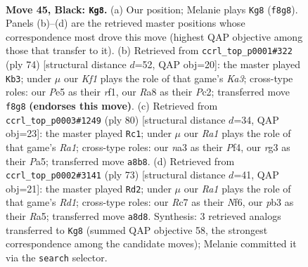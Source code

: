 \documentclass[11pt]{article}
\begin{document}
\clearpage

\begin{figure}[p]\centering
\begin{subfigure}{0.46\textwidth}\centering
\resizebox{\linewidth}{!}{%
\newchessgame
\chessboard[
  setfen={r4k2/2r2p1p/1n4p1/p3p1P1/P3P3/NP4RP/4K1P1/R7 b - - 5 45},
  showmover=false,
  pgfstyle=straightmove, color=movearrow, markmove={f8-g8}
]}
\caption{}
\end{subfigure}\hfill
\begin{subfigure}{0.46\textwidth}\centering
\resizebox{\linewidth}{!}{%
\newchessgame
\chessboard[
  setfen={3k4/p2r1p2/1pR1p1p1/1P2P3/P3R2P/K7/2P4P/5r2 w - - 7 38},
  showmover=false,
  pgfstyle=straightmove, color=movearrow, markmove={a3-b3}
]}
\caption{}
\end{subfigure}
\\[4pt]
\begin{subfigure}{0.46\textwidth}\centering
\resizebox{\linewidth}{!}{%
\newchessgame
\chessboard[
  setfen={r4r2/1R3ppk/p1N1p3/P2p3p/3P1P2/1P2n2P/6P1/R5K1 w - - 0 41},
  showmover=false,
  pgfstyle=straightmove, color=movearrow, markmove={a1-c1}
]}
\caption{}
\end{subfigure}\hfill
\begin{subfigure}{0.46\textwidth}\centering
\resizebox{\linewidth}{!}{%
\newchessgame
\chessboard[
  setfen={3r2k1/1p6/2p2n1p/r4Pp1/2P5/p1R2PP1/P4N1P/R5K1 b - - 0 37},
  showmover=false,
  pgfstyle=straightmove, color=movearrow, markmove={d8-d2}
]}
\caption{}
\end{subfigure}
\caption{\textbf{Move 45, Black: \texttt{Kg8}.} (a) Our position; Melanie plays \texttt{Kg8} (\texttt{f8g8}). Panels (b)--(d) are the retrieved master positions whose correspondence most drove this move (highest QAP objective among those that transfer to it). (b) Retrieved from \texttt{ccrl\_top\_p0001\#322} (ply 74) [structural distance $d$=52, QAP obj=20]: the master played \texttt{Kb3}; under $\mu$ our \emph{Kf1} plays the role of that game's \emph{Ka3}; cross-type roles: our \emph{P}e5 as their \emph{r}f1, our \emph{R}a8 as their \emph{P}c2; transferred move \texttt{f8g8} \textbf{(endorses this move)}. (c) Retrieved from \texttt{ccrl\_top\_p0003\#1249} (ply 80) [structural distance $d$=34, QAP obj=23]: the master played \texttt{Rc1}; under $\mu$ our \emph{Ra1} plays the role of that game's \emph{Ra1}; cross-type roles: our \emph{n}a3 as their \emph{P}f4, our \emph{r}g3 as their \emph{P}a5; transferred move \texttt{a8b8}. (d) Retrieved from \texttt{ccrl\_top\_p0002\#3141} (ply 73) [structural distance $d$=41, QAP obj=21]: the master played \texttt{Rd2}; under $\mu$ our \emph{Ra1} plays the role of that game's \emph{Rd1}; cross-type roles: our \emph{R}c7 as their \emph{N}f6, our \emph{p}b3 as their \emph{R}a5; transferred move \texttt{a8d8}. Synthesis: 3 retrieved analogs transferred to \texttt{Kg8} (summed QAP objective 58, the strongest correspondence among the candidate moves); Melanie committed it via the \texttt{search} selector.}
\label{fig:thought-m89}
\end{figure}
\end{document}
